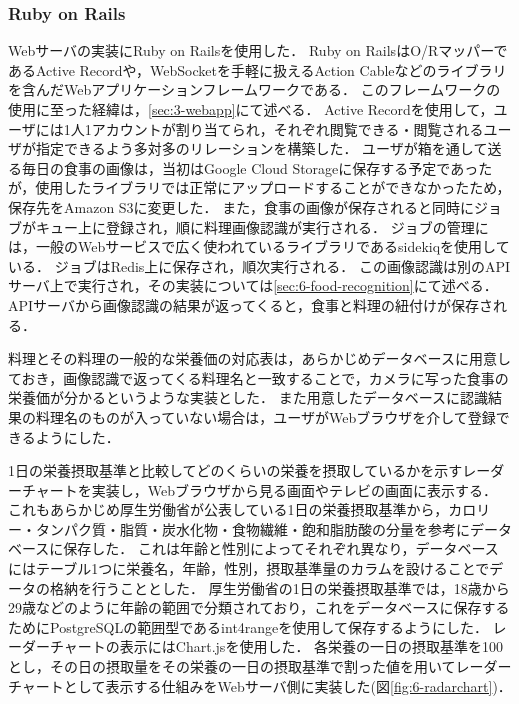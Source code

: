 \documentclass[../report]{subfiles}
\begin{document}
\subsubsection{Ruby on Rails}
Webサーバの実装にRuby on Railsを使用した．
Ruby on RailsはO/RマッパーであるActive Recordや，WebSocketを手軽に扱えるAction Cableなどのライブラリを含んだWebアプリケーションフレームワークである．
このフレームワークの使用に至った経緯は，\ref{sec:3-webapp}にて述べる．
Active Recordを使用して，ユーザには1人1アカウントが割り当てられ，それぞれ閲覧できる・閲覧されるユーザが指定できるよう多対多のリレーションを構築した．
ユーザが箱を通して送る毎日の食事の画像は，当初はGoogle Cloud Storageに保存する予定であったが，使用したライブラリでは正常にアップロードすることができなかったため，保存先をAmazon S3に変更した．
また，食事の画像が保存されると同時にジョブがキュー上に登録され，順に料理画像認識が実行される．
ジョブの管理には，一般のWebサービスで広く使われているライブラリであるsidekiqを使用している．
ジョブはRedis上に保存され，順次実行される．
この画像認識は別のAPIサーバ上で実行され，その実装については\ref{sec:6-food-recognition}にて述べる．
APIサーバから画像認識の結果が返ってくると，食事と料理の紐付けが保存される．

料理とその料理の一般的な栄養価の対応表は，あらかじめデータベースに用意しておき，画像認識で返ってくる料理名と一致することで，カメラに写った食事の栄養価が分かるというような実装とした．
また用意したデータベースに認識結果の料理名のものが入っていない場合は，ユーザがWebブラウザを介して登録できるようにした．

1日の栄養摂取基準と比較してどのくらいの栄養を摂取しているかを示すレーダーチャートを実装し，Webブラウザから見る画面やテレビの画面に表示する．
これもあらかじめ厚生労働省が公表している1日の栄養摂取基準から，カロリー・タンパク質・脂質・炭水化物・食物繊維・飽和脂肪酸の分量を参考にデータベースに保存した．
これは年齢と性別によってそれぞれ異なり，データベースにはテーブル1つに栄養名，年齢，性別，摂取基準量のカラムを設けることでデータの格納を行うこととした．
厚生労働省の1日の栄養摂取基準では，18歳から29歳などのように年齢の範囲で分類されており，これをデータベースに保存するためにPostgreSQLの範囲型であるint4rangeを使用して保存するようにした．
レーダーチャートの表示にはChart.jsを使用した．
各栄養の一日の摂取基準を100とし，その日の摂取量をその栄養の一日の摂取基準で割った値を用いてレーダーチャートとして表示する仕組みをWebサーバ側に実装した(図\ref{fig:6-radarchart})．
\end{document}
